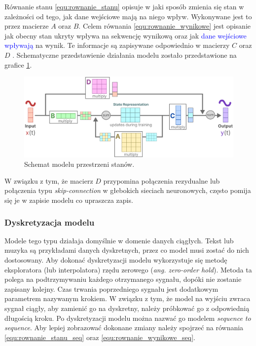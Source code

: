 \documentclass[data-science]{agh-wi} %
\begin{document}
Równanie stanu \ref*{equ:rownanie_stanu} opisuje w jaki sposób zmienia się stan w zależności od tego, jak dane wejściowe mają na niego wpływ. Wykonywane jest to przez macierze $A$ oraz $B$. Celem równania \ref*{equ:rownanie_wynikowe} jest opisanie jak obecny stan ukryty wpływa na sekwencję wynikową oraz jak \textcolor{blue}{dane wejściowe wpływają} na wynik. Te informacje są zapisywane odpowiednio w macierzy $C$ oraz $D$ \cite*{mamba_guide}. Schematyczne przedstawienie działania modelu zostało przedstawione na grafice \ref*{fig:ssm_scheme}.

\begin{figure}[ht!]
    \begin{center}
        \includegraphics[width=0.9\linewidth]{./img/SSM_scheme.png}
    \end{center}
    \caption{Schemat modelu przestrzeni stanów.}\label{fig:ssm_scheme}
\end{figure}

W związku z tym, że macierz $D$ przypomina połączenia rezydualne lub połączenia typu \textit{skip-connection} w głebokich sieciach neuronowych, często pomija się je w zapisie modelu co upraszcza zapis.

\subsubsection*{Dyskretyzacja modelu}
Modele tego typu działaja domyślnie w domenie danych ciągłych. Tekst lub muzyka są przykładami danych dyskretnych, przez co model musi zostać do nich dostosowany. Aby dokonać dyskretyzacji modelu wykorzystuje się metodę eksploratora (lub interpolatora) rzędu zerowego (\textit{ang. zero-order hold}). Metoda ta polega na podtrzymywaniu każdego otrzymanego sygnału, dopóki nie zostanie zapisany kolejny. Czas trwania poprzedniego sygnału jest dodatkowym parametrem nazywanym krokiem. W związku z tym, że model na wyjściu zwraca sygnał ciągły, aby zamienić go na dyskretny, należy próbkować go z odpowiednią długością kroku. Po dyskretyzacji modelu można nazwać go modelem \textit{sequence to sequence}. Aby lepiej zobrazować dokonane zmiany należy spojrzeć na równania \ref*{equ:rownanie_stanu_seq} oraz \ref*{equ:rownanie_wynikowe_seq}.
\end{document}
